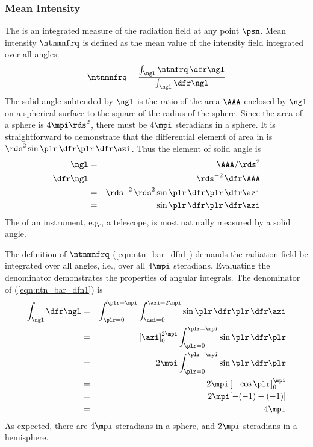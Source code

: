 \documentclass[12pt]{article}
\begin{document}
\subsubsection[Mean Intensity]{Mean Intensity}\label{sxn:ntn_bar}
The  is an integrated measure of the radiation
field at any point $\psn$.
Mean intensity $\ntnmnfrq$ is defined as the mean value of the
intensity field integrated over all angles.
\begin{eqnarray}
\ntnmnfrq = \frac{\int_{\ngl} \ntnfrq \,\dfr\ngl}{\int_{\ngl} \dfr\ngl}
\label{eqn:ntn_bar_dfn1}
\end{eqnarray}
The solid angle subtended by $\ngl$ is the ratio of the area $\AAA$
enclosed by $\ngl$ on a spherical surface to the square of the radius 
of the sphere. 
Since the area of a sphere is $4\mpi\rds^{2}$, there must be $4\mpi$
steradians in a sphere.
It is straightforward to demonstrate that the differential element of
area in  
is $\rds^{2} \sin \plr \,\dfr\plr \,\dfr\azi$. 
Thus the element of solid angle is
\begin{eqnarray}
\ngl & = & \AAA / \rds^{2} \nonumber \\
\dfr\ngl & = & \rds^{-2} \,\dfr\AAA \nonumber \\ 
& = & \rds^{-2} \, \rds^{2} \sin \plr \,\dfr\plr \,\dfr\azi \nonumber \\
& = & \sin \plr \,\dfr\plr \,\dfr\azi 
\label{eqn:ngl}
\end{eqnarray}
The  of an instrument, e.g., a telescope, is
most naturally measured by a solid angle.

The definition of $\ntnmnfrq$ (\ref{eqn:ntn_bar_dfn1}) demands the
radiation field be integrated over all angles, i.e., over all $4\mpi$
steradians. 
Evaluating the denominator demonstrates the properties of angular
integrals.  
The denominator of (\ref{eqn:ntn_bar_dfn1}) is
\begin{eqnarray}
\int_{\ngl} \dfr\ngl & = & \int_{\plr=0}^{\plr=\mpi} \int_{\azi=0}^{\azi=2\mpi} 
\sin \plr \,\dfr\plr \,\dfr\azi \nonumber \\
& = & \left[ \azi \right]_{0}^{2\mpi} \int_{\plr=0}^{\plr=\mpi} \sin
\plr \,\dfr\plr \nonumber \\
& = & 2 \mpi \int_{\plr=0}^{\plr=\mpi} \sin \plr \,\dfr\plr \nonumber \\
& = & 2 \mpi \left[ - \cos \plr \right]_{0}^{\mpi} \nonumber \\
& = & 2 \mpi [-(-1) - (-1)] \nonumber \\
& = & 4 \mpi
\label{eqn:srd_sph_dfn}
\end{eqnarray}
As expected, there are $4\mpi$ steradians in a sphere, and $2\mpi$
steradians in a hemisphere. 
\end{document}
